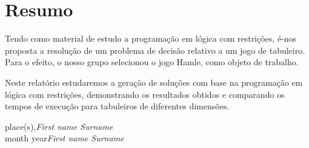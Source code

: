 %
%
%

\chapter{Resumo}

Tendo como material de estudo a programa\c{c}\~ao em l\'ogica com restri\c{c}\~oes, \'e-nos proposta a resolu\c{c}\~ao de um problema de decis\~ao relativo a um jogo de tabuleiro. Para o efeito, o nosso grupo selecionou o jogo Hamle, como objeto de trabalho.

Neste relat\'orio estudaremos a gera\c{c}\~ao de solu\c{c}\~oes com base na programa\c{c}\~ao em l\'ogica com restri\c{c}\~oes, demonstrando os resultados obtidos e comparando os tempos de execu\c{c}\~ao para tabuleiros de diferentes dimens\~oes.


\vspace{1cm}
\begin{flushright}\noindent
place(s),\hfill {\it First name  Surname}\\
month year\hfill {\it First name  Surname}\\
\end{flushright}


